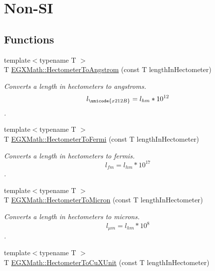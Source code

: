 \hypertarget{group___e_g_x_math-_conversions-_length_conversions-_hectometer-_non-_s_i}{}\section{Non-\/\+SI}
\label{group___e_g_x_math-_conversions-_length_conversions-_hectometer-_non-_s_i}
\subsection*{Functions}
\begin{DoxyCompactItemize}
\item 
{\footnotesize template$<$typename T $>$ }\\T \mbox{\hyperlink{group___e_g_x_math-_conversions-_length_conversions-_hectometer-_non-_s_i_gad1296c0169aa8a99802a30b65a2ea516}{E\+G\+X\+Math\+::\+Hectometer\+To\+Angstrom}} (const T length\+In\+Hectometer)
\begin{DoxyCompactList}\small\item\em Converts a length in hectometers to angstroms. \[ l_{\unicode{x212B}}=l_{hm} * 10^{12} \]. \end{DoxyCompactList}\item 
{\footnotesize template$<$typename T $>$ }\\T \mbox{\hyperlink{group___e_g_x_math-_conversions-_length_conversions-_hectometer-_non-_s_i_gabd26977f3d5ad9d0560afb10be63a598}{E\+G\+X\+Math\+::\+Hectometer\+To\+Fermi}} (const T length\+In\+Hectometer)
\begin{DoxyCompactList}\small\item\em Converts a length in hectometers to fermis. \[ l_{fm}=l_{hm} * 10^{17} \]. \end{DoxyCompactList}\item 
{\footnotesize template$<$typename T $>$ }\\T \mbox{\hyperlink{group___e_g_x_math-_conversions-_length_conversions-_hectometer-_non-_s_i_ga997feaaeb91fc61c1d87c5d77fb7a665}{E\+G\+X\+Math\+::\+Hectometer\+To\+Micron}} (const T length\+In\+Hectometer)
\begin{DoxyCompactList}\small\item\em Converts a length in hectometers to microns. \[ l_{\mu m}=l_{hm} * 10^{8} \]. \end{DoxyCompactList}\item 
{\footnotesize template$<$typename T $>$ }\\T \mbox{\hyperlink{group___e_g_x_math-_conversions-_length_conversions-_hectometer-_non-_s_i_ga5c1d570e3bec185a917f3987d45529be}{E\+G\+X\+Math\+::\+Hectometer\+To\+Cu\+X\+Unit}} (const T length\+In\+Hectometer)

\end{DoxyCompactItemize}
